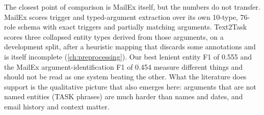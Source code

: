 The closest point of comparison is MailEx itself, but the numbers do not transfer. MailEx scores trigger and typed-argument extraction over its own 10-type, 76-role schema with exact triggers and partially matching arguments. Text2Task scores three collapsed entity types derived from those arguments, on a development split, after a heuristic mapping that discards some annotations and is itself incomplete (\cref{ch:preprocessing}). Our best lenient entity F1 of 0.555 and the MailEx argument-identification F1 of 0.454 measure different things and should not be read as one system beating the other. What the literature does support is the qualitative picture that also emerges here: arguments that are not named entities (TASK phrases) are much harder than names and dates, and email history and context matter.
